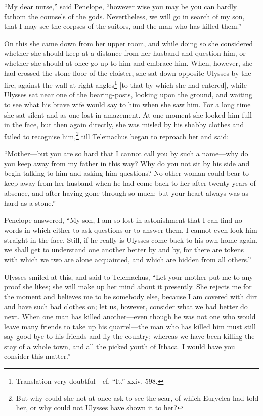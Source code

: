 “My dear nurse,” said Penelope, “however wise you may be you can hardly fathom
the counsels of the gods. Nevertheless, we will go in search of my son, that I
may see the corpses of the suitors, and the man who has killed them.”

On this she came down from her upper room, and while doing so she considered
whether she should keep at a distance from her husband and question him, or
whether she should at once go up to him and embrace him. When, however, she had
crossed the stone floor of the cloister, she sat down opposite Ulysses by the
fire, against the wall at right angles\footnote{Translation very doubtful—cf. “It.” xxiv. 598.} [to that by which she had entered],
while Ulysses sat near one of the bearing-posts, looking upon the ground, and
waiting to see what his brave wife would say to him when she saw him. For a
long time she sat silent and as one lost in amazement. At one moment she looked
him full in the face, but then again directly, she was misled by his shabby
clothes and failed to recognise him,\footnote{But why could she not at once ask to see the scar, of which Euryclea had
told her, or why could not Ulysses have shown it to her?} till Telemachus began to reproach
her and said:

“Mother—but you are so hard that I cannot call you by such a name—why do you
keep away from my father in this way? Why do you not sit by his side and begin
talking to him and asking him questions? No other woman could bear to keep away
from her husband when he had come back to her after twenty years of absence,
and after having gone through so much; but your heart always was as hard as a
stone.”

Penelope answered, “My son, I am so lost in astonishment that I can find no
words in which either to ask questions or to answer them. I cannot even look
him straight in the face. Still, if he really is Ulysses come back to his own
home again, we shall get to understand one another better by and by, for there
are tokens with which we two are alone acquainted, and which are hidden from
all others.”

Ulysses smiled at this, and said to Telemachus, “Let your mother put me to any
proof she likes; she will make up her mind about it presently. She rejects me
for the moment and believes me to be somebody else, because I am covered with
dirt and have such bad clothes on; let us, however, consider what we had better
do next. When one man has killed another—even though he was not one who would
leave many friends to take up his quarrel—the man who has killed him must still
say good bye to his friends and fly the country; whereas we have been killing
the stay of a whole town, and all the picked youth of Ithaca. I would have you
consider this matter.”


